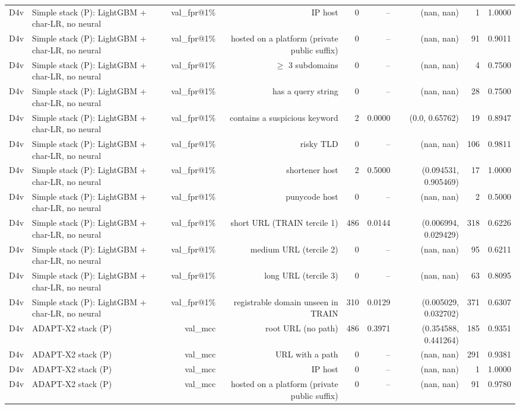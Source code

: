 \begin{table}[t]
\begin{tabular}{llrrrrrrr}
D4v & Simple stack (P): LightGBM + char-LR, no neural & val\_fpr@1\% & IP host & 0 & -- & (nan, nan) & 1 & 1.0000 \\
D4v & Simple stack (P): LightGBM + char-LR, no neural & val\_fpr@1\% & hosted on a platform (private public suffix) & 0 & -- & (nan, nan) & 91 & 0.9011 \\
D4v & Simple stack (P): LightGBM + char-LR, no neural & val\_fpr@1\% & $\geq$ 3 subdomains & 0 & -- & (nan, nan) & 4 & 0.7500 \\
D4v & Simple stack (P): LightGBM + char-LR, no neural & val\_fpr@1\% & has a query string & 0 & -- & (nan, nan) & 28 & 0.7500 \\
D4v & Simple stack (P): LightGBM + char-LR, no neural & val\_fpr@1\% & contains a suspicious keyword & 2 & 0.0000 & (0.0, 0.65762) & 19 & 0.8947 \\
D4v & Simple stack (P): LightGBM + char-LR, no neural & val\_fpr@1\% & risky TLD & 0 & -- & (nan, nan) & 106 & 0.9811 \\
D4v & Simple stack (P): LightGBM + char-LR, no neural & val\_fpr@1\% & shortener host & 2 & 0.5000 & (0.094531, 0.905469) & 17 & 1.0000 \\
D4v & Simple stack (P): LightGBM + char-LR, no neural & val\_fpr@1\% & punycode host & 0 & -- & (nan, nan) & 2 & 0.5000 \\
D4v & Simple stack (P): LightGBM + char-LR, no neural & val\_fpr@1\% & short URL (TRAIN tercile 1) & 486 & 0.0144 & (0.006994, 0.029429) & 318 & 0.6226 \\
D4v & Simple stack (P): LightGBM + char-LR, no neural & val\_fpr@1\% & medium URL (tercile 2) & 0 & -- & (nan, nan) & 95 & 0.6211 \\
D4v & Simple stack (P): LightGBM + char-LR, no neural & val\_fpr@1\% & long URL (tercile 3) & 0 & -- & (nan, nan) & 63 & 0.8095 \\
D4v & Simple stack (P): LightGBM + char-LR, no neural & val\_fpr@1\% & registrable domain unseen in TRAIN & 310 & 0.0129 & (0.005029, 0.032702) & 371 & 0.6307 \\
D4v & ADAPT-X2 stack (P) & val\_mcc & root URL (no path) & 486 & 0.3971 & (0.354588, 0.441264) & 185 & 0.9351 \\
D4v & ADAPT-X2 stack (P) & val\_mcc & URL with a path & 0 & -- & (nan, nan) & 291 & 0.9381 \\
D4v & ADAPT-X2 stack (P) & val\_mcc & IP host & 0 & -- & (nan, nan) & 1 & 1.0000 \\
D4v & ADAPT-X2 stack (P) & val\_mcc & hosted on a platform (private public suffix) & 0 & -- & (nan, nan) & 91 & 0.9780 \\

\end{tabular}
\end{table}
